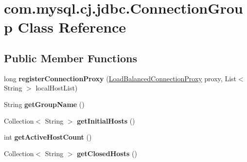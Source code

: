 \hypertarget{classcom_1_1mysql_1_1cj_1_1jdbc_1_1_connection_group}{}\section{com.\+mysql.\+cj.\+jdbc.\+Connection\+Group Class Reference}
\label{classcom_1_1mysql_1_1cj_1_1jdbc_1_1_connection_group}
\subsection*{Public Member Functions}
\begin{DoxyCompactItemize}
\item 
\mbox{\label{classcom_1_1mysql_1_1cj_1_1jdbc_1_1_connection_group_a00ef74169d8d33fcfd16c0e1ec710050}} 
long {\bfseries register\+Connection\+Proxy} (\mbox{\hyperlink{classcom_1_1mysql_1_1cj_1_1jdbc_1_1ha_1_1_load_balanced_connection_proxy}{Load\+Balanced\+Connection\+Proxy}} proxy, List$<$ String $>$ local\+Host\+List)
\item 
\mbox{\label{classcom_1_1mysql_1_1cj_1_1jdbc_1_1_connection_group_ad33eec800f439c1b43d4d6f169601113}} 
String {\bfseries get\+Group\+Name} ()
\item 
\mbox{\label{classcom_1_1mysql_1_1cj_1_1jdbc_1_1_connection_group_a24a09f1c98e51cae302c5d89aa07a906}} 
Collection$<$ String $>$ {\bfseries get\+Initial\+Hosts} ()
\item 
\mbox{\label{classcom_1_1mysql_1_1cj_1_1jdbc_1_1_connection_group_ada9879a96ae8b6ab62909c36c6ec4c0e}} 
int {\bfseries get\+Active\+Host\+Count} ()
\item 
\mbox{\label{classcom_1_1mysql_1_1cj_1_1jdbc_1_1_connection_group_a550b8887e3871ddc0fa80085a8afe587}} 
Collection$<$ String $>$ {\bfseries get\+Closed\+Hosts} ()
\item 
\mbox{\label{classcom_1_1mysql_1_1cj_1_1jdbc_1_1_connection_group_a5ba84e80b4fe2df7a8d4bb28fa031faa}} 

\end{DoxyCompactItemize}
